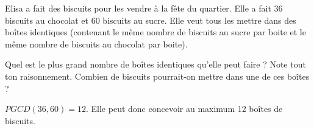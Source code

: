 \documentclass[parskip=half-,twoside=semi, 12pt]{scrartcl}
\newcommand{\figcolor}{white}
\begin{document}
\begin{transferer}[points=3]
    Elisa a fait des biscuits pour les vendre à la fête du quartier. Elle a
    fait 36 biscuits au chocolat et 60 biscuits au sucre. Elle veut tous les
    mettre dans des boîtes identiques (contenant le même nombre de biscuits au sucre par boite et le même nombre de biscuits au chocolat par boite).
    \begin{tasks}[after-item-skip=7cm]
        \task Quel est le plus grand nombre de boîtes identiques qu'elle peut faire ? Note tout ton raisonnement.
        \task Combien de biscuits pourrait-on mettre dans une de ces boîtes ? 
    \end{tasks}
\end{transferer}
\begin{soltransferer}
    \(PGCD(36,60) = 12\). Elle peut donc concevoir au maximum 12 boîtes de biscuits.
\end{soltransferer}
\end{document}
